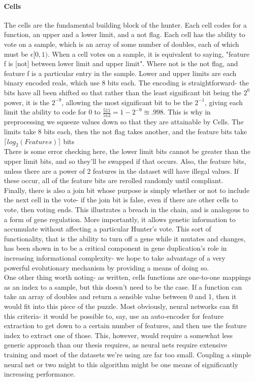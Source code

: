 \paragraph{Cells}
The cells are the fundamental building block of the hunter.  Each cell codes for a function, an upper and a lower limit, and a not flag.  Each cell has the ability to vote on a sample, which is an array of some number of doubles, each of which must be $\epsilon[0,1)$.  When a cell votes on a sample, it is equivalent to saying, "feature f is [not] between lower limit and upper limit".  Where not is the not flag, and feature f is a particular entry in the sample.  Lower and upper limits are each binary encoded reals, which use 8 bits each.  The encoding is straightforward- the bits have all been shifted so that rather than the least significant bit being the $2^0$ power, it is the $2^{-9}$, allowing the most significant bit to be the $2^{-1}$, giving each limit the ability to code for 0 to $\frac{511}{512}= 1-2^{-9} \approxeq .998 $.  This is why in preprocessing we squeeze values down so that they are attainable by Cells.  The limits take 8 bits each, then the not flag takes another, and the feature bits take $\lceil log_2(Features)\rceil$ bits\\There is some error checking here, the lower limit bits cannot be greater than the upper limit bits, and so they'll be swapped if that occurs.  Also, the feature bits, unless there are a power of 2 features in the dataset will have illegal values.  If these occur, all of the feature bits are rerolled randomly until compliant.\\
Finally, there is also a join bit whose purpose is simply whether or not to include the next cell in the vote- if the join bit is false, even if there are other cells to vote, then voting ends.  This illustrates a breach in the chain, and is  analogous to a form of gene regulation.  More importantly, it allows genetic information to accumulate without affecting a particular Hunter's vote.  This sort of functionality, that is the ability to turn off a gene while it mutates and changes, has been shown in \cite{zhang_evolution_2003} to be a critical component in gene duplication's role in increasing informational complexity- we hope to take advantage of a very powerful evolutionary mechanism by providing a means of doing so.\\
One other thing worth noting- as written, cells functions are one-to-one mappings as an index to a sample, but this doesn't need to be the case.  If a function can take an array of doubles and return a sensible value between 0 and 1, then it would fit into this piece of the puzzle.  Most obviously, neural networks can fit this criteria- it would be possible to, say, use an auto-encoder for feature extraction to get down to a certain number of features, and then use the feature index to extract one of those.  This, however, would require a somewhat less generic approach than our thesis requires, as neural nets require extensive training and most of the datasets we're using are far too small.  Coupling a simple neural net or two might to this algorithm might be one means of significantly increasing performance. \\
